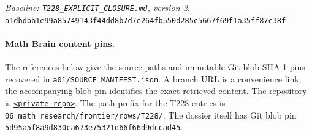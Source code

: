 \documentclass[11pt,a4paper]{article}
\numberwithin{equation}{section}
\theoremstyle{remark}
\newcommand{\sourcehash}[1]{{\small\texttt{#1}}}
\begin{document}
\noindent\emph{Baseline: \texttt{T228\_EXPLICIT\_CLOSURE.md}, version 2.}\\
\sourcehash{a1dbdbb1e99a85749143f44dd8b7d7e264fb550d285c5667f69f1a35ff87c38f}

\paragraph{Math Brain content pins.}
The references below give the source paths and immutable Git blob SHA-1
pins recovered in \texttt{a01/SOURCE\_MANIFEST.json}. A branch URL is a
convenience link; the accompanying blob pin identifies the exact retrieved
content. The repository is
\href{https://github.com/<private-repo>}
{\texttt{<private-repo>}}.
The path prefix for the T228 entries is
\texttt{06\_math\_research/frontier/rows/T228/}.
The dossier itself has Git blob pin
\sourcehash{5d95a5f8a9d830ca673e75321d66f66d9dccad45}.

\end{document}
